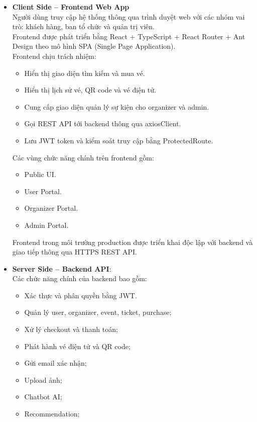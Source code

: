 \begin{itemize}
    \item[1.] \textbf{Client Side – Frontend Web App}\\
    Người dùng truy cập hệ thống thông qua trình duyệt web với các nhóm vai trò: khách hàng, ban tổ chức và quản trị viên.\\
    Frontend được phát triển bằng React + TypeScript + React Router + Ant Design theo mô hình SPA (Single Page Application).\\
    Frontend chịu trách nhiệm:
    \begin{itemize}
        \item[-] Hiển thị giao diện tìm kiếm và mua vé.
        \item[-] Hiển thị lịch sử vé, QR code và vé điện tử.
        \item[-] Cung cấp giao diện quản lý sự kiện cho organizer và admin.
        \item[-] Gọi REST API tới backend thông qua axiosClient.
        \item[-] Lưu JWT token và kiểm soát truy cập bằng ProtectedRoute.
    \end{itemize}
    Các vùng chức năng chính trên frontend gồm:
    \begin{itemize}
        \item[-] Public UI.
        \item[-] User Portal.
        \item[-] Organizer Portal.
        \item[-] Admin Portal.
    \end{itemize}
    Frontend trong môi trường production được triển khai độc lập với backend và giao tiếp thông qua HTTPS REST API.
    \item[2.] \textbf{Server Side – Backend API}: \\
    Các chức năng chính của backend bao gồm:
    \begin{itemize}
        \item[-] Xác thực và phân quyền bằng JWT.
        \item[-] Quản lý user, organizer, event, ticket, purchase;
        \item[-] Xử lý checkout và thanh toán;
        \item[-] Phát hành vé điện tử và QR code;
        \item[-] Gửi email xác nhận;
        \item[-] Upload ảnh;
        \item[-] Chatbot AI;
        \item[-] Recommendation;

\end{itemize}
\end{itemize}
